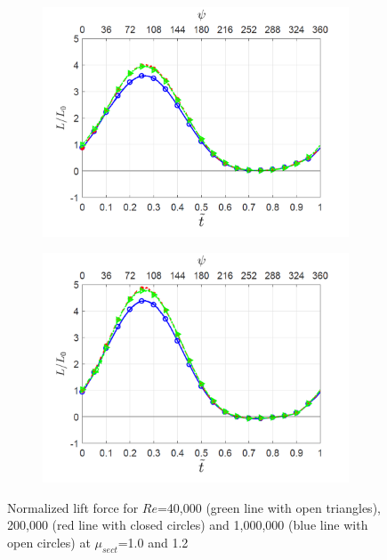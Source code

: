 \begin{figure}[H]
	\begin{subfigure}{0.5\textwidth}
		\includegraphics[width=1\textwidth]{figures/lift_Re_effect_lambda_1pt0.png}
		\label{fig:lift_Re_comparision_lambda_1p0}
	\end{subfigure}
 	\begin{subfigure}{0.5\textwidth}
		\includegraphics[width=1\textwidth]{figures/lift_Re_effect_lambda_1pt2.png}
		\label{fig:lift_Re_comparision_lambda_1p2}
	\end{subfigure}

 	\caption{Normalized lift force for $Re$=40,000 (green line with open triangles), 200,000 (red line with closed circles) and 1,000,000 (blue line with open circles) at $\mu_{sect}$=1.0 and 1.2}
 	\label{fig:lift_comparison}
\end{figure}

